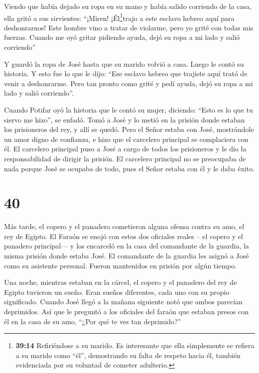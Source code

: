  Viendo que había dejado su ropa en su mano y había salido
corriendo de la casa,  ella gritó a sus sirvientes:
``¡Miren! ¡Él\footnote{\textbf{39:14} Refiriéndose a su marido. Es
  interesante que ella simplemente se refiera a su marido como ``él'',
  demostrando su falta de respeto hacia él, también evidenciada por su
  voluntad de cometer adulterio.}trajo a este esclavo hebreo aquí para
deshonrarnos! Este hombre vino a tratar de violarme, pero yo grité con
todas mis fuerzas.  Cuando me oyó gritar pidiendo ayuda,
dejó su ropa a mi lado y salió corriendo''

 Y guardó la ropa de José hasta que su marido volvió a
casa.  Luego le contó su historia. Y esto fue lo que le
dijo: ``Ese esclavo hebreo que trajiste aquí trató de venir a
deshonrarme.  Pero tan pronto como grité y pedí ayuda, dejó
su ropa a mi lado y salió corriendo''.

 Cuando Potifar oyó la historia que le contó su mujer,
diciendo: ``Esto es lo que tu siervo me hizo'', se enfadó. 
Tomó a José y lo metió en la prisión donde estaban los prisioneros del
rey, y allí se quedó.  Pero el Señor estaba con José,
mostrándole un amor digno de confianza, e hizo que el carcelero
principal se complaciera con él.  El carcelero principal
puso a José a cargo de todos los prisioneros y le dio la responsabilidad
de dirigir la prisión.  El carcelero principal no se
preocupaba de nada porque José se ocupaba de todo, pues el Señor estaba
con él y le daba éxito.

\hypertarget{section-39}{%
\section{40}\label{section-39}}

 Más tarde, el copero y el panadero cometieron alguna ofensa
contra su amo, el rey de Egipto.  El Faraón se enojó con
estos dos oficiales reales -- el copero y el panadero principal---
 y los encarceló en la casa del comandante de la guardia, la
misma prisión donde estaba José.  El comandante de la
guardia les asignó a José como su asistente personal. Fueron mantenidos
en prisión por algún tiempo.

 Una noche, mientras estaban en la cárcel, el copero y el
panadero del rey de Egipto tuvieron un sueño. Eran sueños diferentes,
cada uno con su propio significado.  Cuando José llegó a la
mañana siguiente notó que ambos parecían deprimidos.  Así
que le preguntó a los oficiales del faraón que estaban presos con él en
la casa de su amo, ``¿Por qué te ves tan deprimido?''


